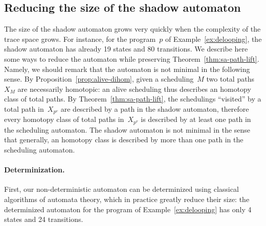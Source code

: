 \documentclass[orivec]{llncs} \usepackage[T1]{fontenc}
\begin{document}
\subsection{Reducing the size of the shadow automaton}
The size of the shadow automaton grows very quickly when the complexity of the
trace space grows. For instance, for the program~$p$ of
Example~\ref{ex:delooping}, the shadow automaton has already 19 states and 80
transitions. We describe here some ways to reduce the automaton while preserving
Theorem~\ref{thm:sa-path-lift}. Namely, we should remark that the automaton is
not minimal in the following sense. By Proposition~\ref{prop:alive-dihom}, given
a scheduling~$M$ two total paths~$X_M$ are necessarily homotopic: an alive
scheduling thus describes an homotopy class of total paths. By
Theorem~\ref{thm:sa-path-lift}, the schedulings ``visited'' by a total path
in~$X_{p^v}$ are described by a path in the shadow automaton, therefore every
homotopy class of total paths in~$X_{p^v}$ is described by at least one path in
the scheduling automaton. The shadow automaton is not minimal in the sense that
generally, an homotopy class is described by more than one path in the
scheduling automaton.

\paragraph{Determinization.}
First, our non-deterministic automaton can be determinized using classical
algorithms of automata theory, which in practice greatly reduce their size: the
determinized automaton for the program of Example~\ref{ex:delooping} has only 4
states and 24 transitions.
\end{document}

